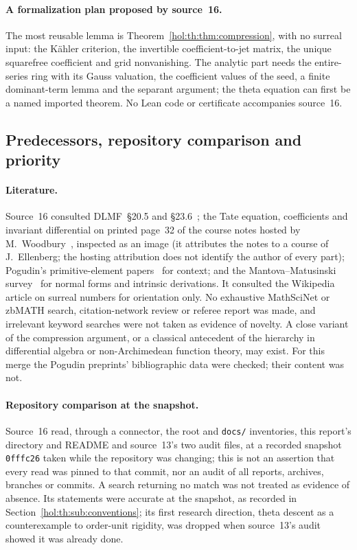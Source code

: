 \documentclass[11pt]{article}
\numberwithin{equation}{section}
\theoremstyle{definition}
\theoremstyle{remark}
\begin{document}
\paragraph{A formalization plan proposed by source~16.}
The most reusable lemma is Theorem~\ref{hol:th:thm:compression}, with no
surreal input: the K\"ahler criterion, the invertible coefficient-to-jet
matrix, the unique squarefree coefficient and grid nonvanishing. The analytic
part needs the entire-series ring with its Gauss valuation, the coefficient
values of the seed, a finite dominant-term lemma and the separant argument;
the theta equation can first be a named imported theorem. No Lean code or
certificate accompanies source~16.

\subsection{Predecessors, repository comparison and priority}
\label{hol:th:sub:predecessors}

\paragraph{Literature.}
Source~16 consulted DLMF~\S20.5 and \S23.6~\cite{dlmftheta,dlmfelliptic}; the
Tate equation, coefficients and invariant differential on printed page~32 of
the course notes hosted by M.~Woodbury~\cite{woodbury}, inspected as an image
(it attributes the notes to a course of J.~Ellenberg; the hosting attribution
does not identify the author of every part); Pogudin's primitive-element
papers~\cite{pogudin2014,pogudin2018} for context; and the Mantova--Matusinski
survey~\cite{mantovamatusinski} for normal forms and intrinsic derivations. It
consulted the Wikipedia article on surreal numbers for orientation only. No
exhaustive MathSciNet or zbMATH search, citation-network review or referee
report was made, and irrelevant keyword searches were not taken as evidence
of novelty. A close variant of the compression argument, or a classical
antecedent of the hierarchy in differential algebra or non-Archimedean
function theory, may exist. For this merge the Pogudin preprints'
bibliographic data were checked; their content was not.

\paragraph{Repository comparison at the snapshot.}
Source~16 read, through a connector, the root and \texttt{docs/} inventories,
this report's directory and README and source~13's two audit files, at a
recorded snapshot \texttt{0fffc26} taken while the repository was changing;
this is not an assertion that every read was pinned to that commit, nor an
audit of all reports, archives, branches or commits. A search returning no
match was not treated as evidence of absence. Its statements were accurate
at the snapshot, as recorded in Section~\ref{hol:th:sub:conventions}; its
first research direction, theta descent as a counterexample to order-unit
rigidity, was dropped when source~13's audit showed it was already done.
\end{document}
